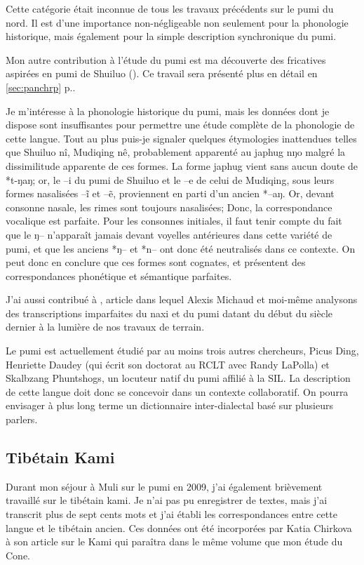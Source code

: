 \documentclass[oldfontcommands,oneside,a4paper,11pt]{memoir}
\newcommand{\ipa}[1]{{\phon #1}} %
\begin{document}
Cette catégorie était inconnue de tous les travaux précédents sur le pumi du nord. Il est d'une importance non-négligeable non seulement pour la phonologie historique, mais également pour la simple description synchronique du pumi.

Mon autre contribution à l'étude du pumi est ma découverte des fricatives aspirées en pumi de Shuiluo (\citealt{jacques11lingua}). Ce travail sera présenté plus en détail en \ref{sec:panchrp} p.\pageref{sec:panchrp}.

Je m'intéresse à la phonologie historique du pumi, mais les données dont je dispose sont insuffisantes pour permettre une étude complète de la phonologie de cette langue. Tout au plus puis-je signaler quelques étymologies inattendues telles que Shuiluo \ipa{nî}, Mudiqing \ipa{nê}, probablement apparenté au japhug \ipa{nŋo} malgré la dissimilitude apparente de ces formes. La forme japhug vient sans aucun doute  de *t-ŋaŋ; or, le --i du pumi de Shuiluo et le --e de celui de Mudiqing, sous leurs formes nasalisées --ĩ et --ẽ, proviennent en parti d'un ancien *--aŋ. Or, devant consonne nasale, les rimes sont toujours nasalisées; Donc, la correspondance vocalique est parfaite. Pour les consonnes initiales, il faut tenir compte du fait que le ŋ-- n'apparaît jamais devant voyelles antérieures dans cette variété de pumi, et que les anciens *ŋ-- et *n-- ont donc été neutralisés dans ce contexte. On peut donc en conclure que ces formes sont cognates, et présentent des correspondances phonétique et sémantique parfaites.

J'ai aussi contribué à \citet{michaud10bonin}, article dans lequel Alexis Michaud et moi-même analysons des transcriptions imparfaites du naxi et du pumi datant du début du siècle dernier à la lumière de nos travaux de terrain.
 


Le pumi est actuellement étudié par au moins trois autres chercheurs, Picus Ding, Henriette Daudey (qui écrit son doctorat au RCLT avec Randy LaPolla) et Skalbzang Phuntshogs, un locuteur natif  du pumi affilié à la SIL. La description de cette langue doit donc se concevoir dans un contexte collaboratif. On pourra envisager à plus long terme un dictionnaire inter-dialectal basé sur plusieurs parlers. 

\subsection{Tibétain Kami}
Durant mon séjour à Muli sur le pumi en 2009, j'ai également brièvement travaillé sur le tibétain kami. Je n'ai pas pu enregistrer de textes, mais j'ai transcrit plus de sept cents mots et j'ai établi les correspondances entre cette langue et le tibétain ancien. Ces données ont été incorporées par Katia Chirkova à son article sur le Kami qui paraîtra dans le même volume que mon étude du Cone.
\end{document}
